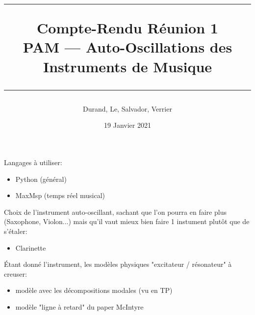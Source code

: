 \documentclass[a4paper, 11pt]{article}
\title{
	\noindent\rule{\linewidth}{0.4pt}
	\huge{Compte-Rendu Réunion 1\\}
	\medskip
	\Large{PAM --- Auto-Oscillations des Instruments de Musique}
	\noindent\rule{\linewidth}{1pt}
}
\author{Durand, Le, Salvador, Verrier}
\date{19 Janvier 2021}
\begin{document}
\maketitle

Langages à utiliser:
\begin{itemize}
\item Python (général)
\item MaxMsp (temps réel musical)
\end{itemize}

\bigskip

Choix de l'instrument auto-oscillant, sachant que l'on pourra en faire plus (Saxophone, Violon...) mais qu'il vaut mieux bien faire 1 instument plutôt que de s'étaler:
\begin{itemize}
\item Clarinette
\end{itemize}

\bigskip

Étant donné l'instrument, les modèles physiques "excitateur / résonateur" à creuser:
\begin{itemize}
\item modèle avec les décompositions modales (vu en TP)
\item modèle "ligne à retard" du paper McIntyre
\end{itemize}

\bigskip
\end{document}
